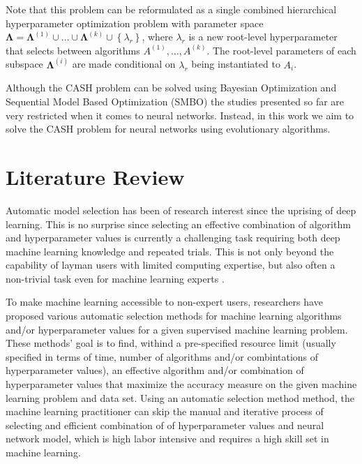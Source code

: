 \documentclass[journal]{IEEEtran}
\begin{document}
Note that this problem can be reformulated as a single combined hierarchical hyperparameter optimization problem with parameter space $\mathbf{\Lambda} =  \mathbf{\Lambda}^{(1)} \cup \ldots \cup \mathbf{\Lambda}^{(k)} \cup \left\lbrace \lambda_r \right\rbrace$, where $\lambda_r$ is a new root-level hyperparameter that selects between algorithms $A^{(1)}, \ldots, A^{(k)}$. The root-level parameters of each subspace $\mathbf{\Lambda}^{(i)}$ are made conditional on $\lambda_r$ being instantiated to $A_i$.

Although the CASH problem can be solved using Bayesian Optimization \cite{Brochu2010} and Sequential Model Based Optimization (SMBO) \cite{Hutter2011} the studies presented so far are very restricted when it comes to neural networks. Instead, in this work we aim to solve the CASH problem for neural networks using evolutionary algorithms.


\section{Literature Review}
\label{sec:literature_review}

Automatic model selection has been of research interest since the uprising of deep learning. This is no surprise since selecting an effective combination of algorithm and hyperparameter values is currently a challenging task requiring both deep machine learning knowledge and repeated trials. This is not only beyond the capability of layman users with limited computing expertise, but also often a non-trivial task even for machine learning experts \cite{sparks2015}. 

To make machine learning accessible to non-expert users, researchers have proposed various automatic selection methods for machine learning algorithms and/or hyperparameter values for a given supervised machine learning problem. These methods' goal is to find, withind a pre-specified resource limit (usually specified in terms of time, number of algorithms and/or combintations of hyperparameter values), an effective algorithm and/or combination of hyperparameter values that maximize the accuracy measure on the given machine learning problem and data set. Using an automatic selection method method, the machine learning practitioner can skip the manual and iterative process of selecting and efficient combination of of hyperparameter values and neural network model, which is high labor intensive and requires a high skill set in machine learning.
\end{document}
